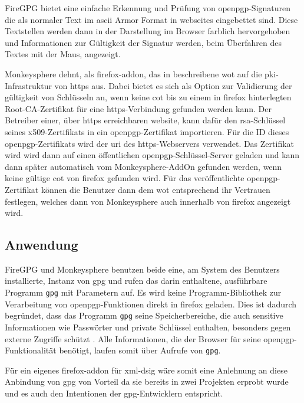 FireGPG bietet eine einfache Erkennung und Prüfung von \gls{openpgp}-Signaturen die als normaler Text im \gls{ascii} Armor Format \cite{openpgp:ietf} in
\glspl{webseite} eingebettet sind. Diese Textstellen werden dann in der Darstellung im Browser farblich hervorgehoben und Informationen zur Gültigkeit der
Signatur werden, beim Überfahren des Textes mit der Maus, angezeigt.

Monkeysphere dehnt, als \gls{firefox-addon}, das in  beschreibene \gls{wot} auf die \gls{pki}-Infrastruktur von
\gls{https} aus. Dabei bietet es sich als Option zur Validierung der gültigkeit von Schlüsseln an, wenn keine \gls{cot} bis zu einem in \gls{firefox}
hinterlegten Root-CA-Zertifikat für eine \gls{https}-Verbindung gefunden werden kann. Der Betreiber einer, über \gls{https} erreichbaren \gls{website}, kann
dafür den \gls{rsa}-Schlüssel seines \gls{x509}-Zertifikats in ein \gls{openpgp}-Zertifikat importieren. Für die ID dieses \gls{openpgp}-Zertifikats wird der
\gls{uri} des \gls{https}-Webservers verwendet. Das Zertifikat wird wird dann auf einen öffentlichen \gls{openpgp}-Schlüssel-Server geladen und kann dann später
automatisch vom Monkeysphere-AddOn gefunden werden, wenn keine gültige \gls{cot} von \gls{firefox} gefunden wird. Für das veröffentlichte
\gls{openpgp}-Zertifikat können die Benutzer dann dem \gls{wot} entsprechend ihr Vertrauen festlegen, welches dann von Monkeysphere auch innerhalb von
\gls{firefox} angezeigt wird.

\subsection{Anwendung}
FireGPG und Monkeysphere benutzen beide eine, am System des Benutzers installierte, Instanz von \gls{gpg} und rufen das darin enthaltene, ausführbare Programm
\texttt{gpg} mit Parametern auf. Es wird keine Programm-Bibliothek zur Verarbeitung von \gls{openpgp}-Funktionen direkt in \gls{firefox} geladen. Dies ist dadurch
begründet, dass das Programm \texttt{gpg} seine Speicherbereiche, die auch sensitive Informationen wie Passwörter und private Schlüssel enthalten, besonders
gegen externe Zugriffe schützt \cite{pgp}. Alle Informationen, die der Browser für seine \gls{openpgp}-Funktionalität benötigt, laufen somit über Aufrufe von
\texttt{gpg}.

Für ein eigenes \gls{firefox-addon} für \gls{xml-dsig} wäre somit eine Anlehnung an diese Anbindung von \gls{gpg} von Vorteil da sie bereits in zwei Projekten
erprobt wurde und es auch den Intentionen der \gls{gpg}-Entwicklern entspricht.
\todo

